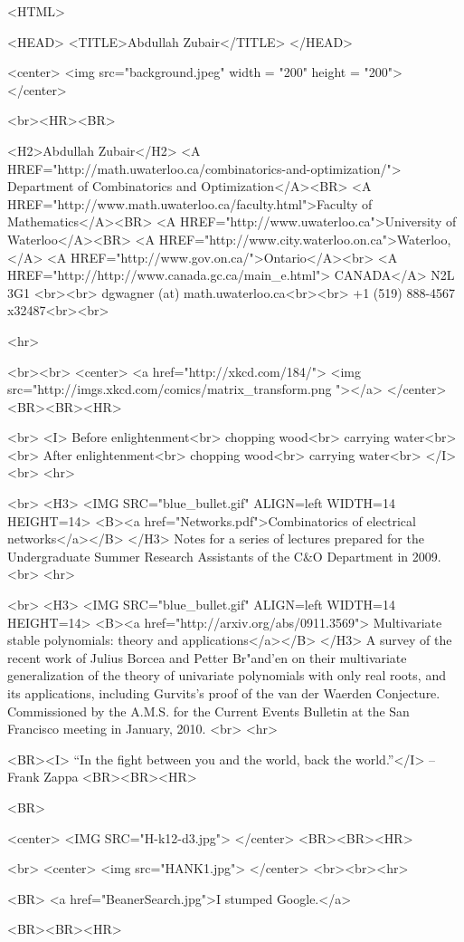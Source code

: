 <HTML>

<HEAD>
<TITLE>Abdullah Zubair</TITLE>
</HEAD>

<center>
<img src="background.jpeg" width = "200" height = "200">
</center>

<br><HR><BR>


<H2>Abdullah Zubair</H2>
<A HREF="http://math.uwaterloo.ca/combinatorics-and-optimization/">
Department of Combinatorics and Optimization</A><BR>
<A HREF="http://www.math.uwaterloo.ca/faculty.html">Faculty of Mathematics</A><BR>
<A HREF="http://www.uwaterloo.ca">University of Waterloo</A><BR>
<A HREF="http://www.city.waterloo.on.ca">Waterloo,</A>
<A HREF="http://www.gov.on.ca/">Ontario</A><br>
<A HREF="http://http://www.canada.gc.ca/main_e.html"> CANADA</A> N2L 3G1 <br><br>
dgwagner (at) math.uwaterloo.ca<br><br>
+1 (519) 888-4567 x32487<br><br>

<hr>

<br><br>
<center>
<a href="http://xkcd.com/184/">
<img src="http://imgs.xkcd.com/comics/matrix_transform.png "></a>
 </center>
<BR><BR><HR>

<br>
<I>
Before enlightenment<br>
chopping wood<br>
carrying water<br><br>
After enlightenment<br>
chopping wood<br>
carrying water<br>
</I>
<br>
<hr>

<br>
<H3> <IMG SRC="blue_bullet.gif" ALIGN=left WIDTH=14 HEIGHT=14>
<B><a href="Networks.pdf">Combinatorics of electrical networks</a></B>
</H3>
Notes for a series of lectures prepared for the Undergraduate Summer
Research Assistants of the C&O Department in 2009.
<br>
<hr>

<br>
<H3> <IMG SRC="blue_bullet.gif" ALIGN=left WIDTH=14 HEIGHT=14>
<B><a href="http://arxiv.org/abs/0911.3569">
Multivariate stable polynomials: theory and applications</a></B>
</H3>
A survey of the recent work of Julius Borcea and Petter Br"and'en
on their multivariate generalization of the theory of univariate
polynomials with only real roots, and its applications, including
Gurvits's proof of the van der Waerden Conjecture.
Commissioned by the A.M.S. for the Current Events Bulletin at the San Francisco
meeting in January, 2010.
<br>
<hr>

<BR><I>
``In the fight between you and the world, back the world.''</I>
-- Frank Zappa 
<BR><BR><HR>

<BR>

<center>
<IMG SRC="H-k12-d3.jpg">
</center>
<BR><BR><HR>

<br>
<center>
<img src="HANK1.jpg">
</center>
<br><br><hr>

<BR>
<a href="BeanerSearch.jpg">I stumped Google.</a>

<BR><BR><HR>
